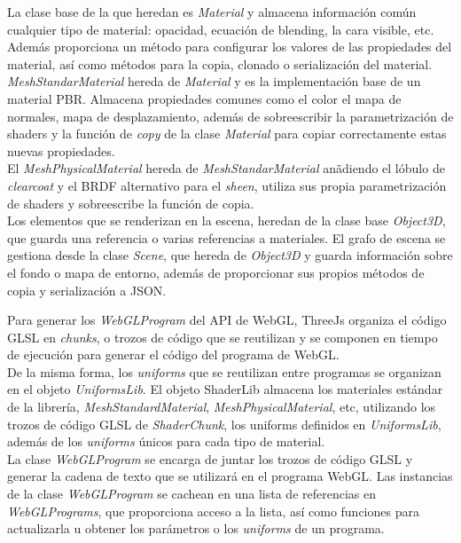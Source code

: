 La clase base de la que heredan es \textit{Material} y almacena informaci\'on com\'un
cualquier tipo de material: opacidad, ecuaci\'on de blending, la cara visible, etc. Adem\'as proporciona un m\'etodo
para configurar los valores de las propiedades del material, as\'i como m\'etodos para la copia, clonado o serializaci\'on
del material.\\

\textit{MeshStandarMaterial} hereda de \textit{Material} y es la implementaci\'on base de un material PBR. Almacena propiedades comunes
como el color el mapa de normales, mapa de desplazamiento, adem\'as de sobreescribir la parametrizaci\'on de shaders y la funci\'on de \textit{copy} de la clase \textit{Material} para copiar correctamente
estas nuevas propiedades.\\

El \textit{MeshPhysicalMaterial} hereda de \textit{MeshStandarMaterial} an\~adiendo el l\'obulo de \textit{clearcoat} y
el BRDF alternativo para el \textit{sheen}, utiliza sus propia parametrizaci\'on de shaders y sobreescribe la funci\'on de copia.\\

Los elementos que se renderizan en la escena, heredan de la clase base \textit{Object3D}, que guarda una referencia o varias
referencias a materiales. El grafo de escena se gestiona desde la clase \textit{Scene}, que hereda de \textit{Object3D} y guarda
informaci\'on sobre el fondo o mapa de entorno, adem\'as de proporcionar sus propios m\'etodos de copia y serializaci\'on
a JSON.



Para generar los \textit{WebGLProgram} del API de WebGL, ThreeJs organiza el c\'odigo GLSL en \textit{chunks}, o trozos de c\'odigo
que se reutilizan y se componen en tiempo de ejecuci\'on para generar el c\'odigo del programa de WebGL.\\

De la misma forma, los \textit{uniforms} que se reutilizan entre programas se organizan en el objeto \textit{UniformsLib}. El objeto ShaderLib almacena
los materiales est\'andar de la librer\'ia, \textit{MeshStandardMaterial}, \textit{MeshPhysicalMaterial}, etc, utilizando los trozos
de c\'odigo GLSL de \textit{ShaderChunk}, los uniforms definidos en \textit{UniformsLib}, adem\'as de los \textit{uniforms} \'unicos
para cada tipo de material.\\

La clase \textit{WebGLProgram} se encarga de juntar los trozos de c\'odigo GLSL y generar la cadena de texto que se utilizar\'a en
el programa WebGL. Las instancias de la clase \textit{WebGLProgram} se cachean en una lista de referencias en \textit{WebGLPrograms}, que proporciona
acceso a la lista, as\'i como funciones para actualizarla u obtener los par\'ametros o los \textit{uniforms} de un programa. \\

